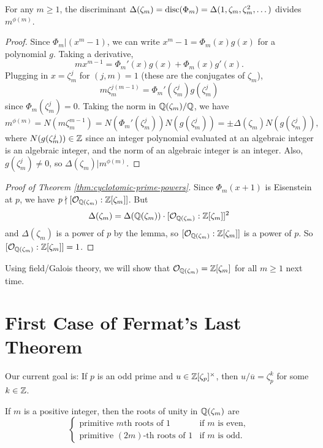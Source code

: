 \begin{lemma}
  For any $m \ge 1$, the
  discriminant $\Delta(\zeta_m) = \operatorname{disc}(\Phi_m) = \Delta(1, \zeta_m, \zeta_m^2, \dots)$
  divides $m^{\phi(m)}$.
\end{lemma}

\begin{proof}
  Since $\Phi_m | (x^m - 1)$, we can write
  $x^m - 1 = \Phi_m(x) g(x)$ for a polynomial $g$.
  Taking
  a derivative,
  \[
    mx^{m - 1} = \Phi_m'(x) g(x) + \Phi_m(x) g'(x).
  \]
  Plugging in $x = \zeta_m^j$ for $(j, m) = 1$ (these
  are the conjugates of $\zeta_m$),
  \[
    m\zeta_m^{j(m - 1)} = \Phi_m'(\zeta_m^j) g(\zeta_m^j)
  \]
  since $\Phi_m(\zeta_m^j) = 0$. Taking the norm in
  $\mathbb{Q}(\zeta_m) / \mathbb{Q}$, we have
  \[
    m^{\phi(m)}
    = N(m \zeta_m^{m - 1})
    = N(\Phi_m'(\zeta_m^j)) N(g(\zeta_m^j))
    = \pm \Delta(\zeta_m) N(g(\zeta_m^j)),
  \]
  where $N(g(\zeta_m^j)) \in \mathbb{Z}$
  since an integer polynomial evaluated at an algebraic
  integer is an algebraic integer, and the norm of
  an algebraic integer is an integer. Also,
  $g(\zeta_m^j) \ne 0$, so $\Delta(\zeta_m) | m^{\phi(m)}$.
\end{proof}

\begin{proof}[Proof of Theorem \ref{thm:cyclotomic-prime-powers}]
  Since $\Phi_m(x + 1)$ is Eisenstein at $p$,
  we have $p \nmid [\mathcal{O}_{\mathbb{Q}(\zeta_m)} : \mathbb{Z}[\zeta_m]]$.
  But
  \[
    \Delta(\zeta_m) = \Delta(\mathbb{Q}(\zeta_m)) \cdot [\mathcal{O}_{\mathbb{Q}(\zeta_m)} : \mathbb{Z}[\zeta_m]]^2
  \]
  and $\Delta(\zeta_m)$ is a power of $p$ by the
  lemma, so $[\mathcal{O}_{\mathbb{Q}(\zeta_m)} : \mathbb{Z}[\zeta_m]]$ is a power of $p$.
  So $[\mathcal{O}_{\mathbb{Q}(\zeta_m)} : \mathbb{Z}[\zeta_m]] = 1$.
\end{proof}

\begin{remark}
  Using field/Galois theory, we will show
  that $\mathcal{O}_{\mathbb{Q}(\zeta_m)} = \mathbb{Z}[\zeta_m]$
  for all $m \ge 1$ next time.
\end{remark}

\section{First Case of Fermat's Last Theorem}

\begin{remark}
  Our current goal is: If
  $p$ is an odd prime and $u \in \mathbb{Z}[\zeta_p]^\times$,
  then $u / \overline{u} = \zeta_p^k$ for some
  $k \in \mathbb{Z}$.
\end{remark}

\begin{lemma}
  If $m$ is a positive integer, then the roots
  of unity in $\mathbb{Q}(\zeta_m)$ are
  \[
    \begin{cases}
      \text{primitive $m$th roots of $1$} & \text{if $m$ is even}, \\
      \text{primitive $(2m)$-th roots of $1$} & \text{if $m$ is odd}.
    \end{cases}
  \]
\end{lemma}

